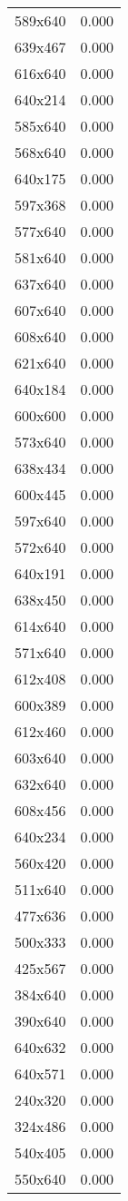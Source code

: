 \begin{table}
\begin{tabular}{lr}
589x640 & 0.000 \\
639x467 & 0.000 \\
616x640 & 0.000 \\
640x214 & 0.000 \\
585x640 & 0.000 \\
568x640 & 0.000 \\
640x175 & 0.000 \\
597x368 & 0.000 \\
577x640 & 0.000 \\
581x640 & 0.000 \\
637x640 & 0.000 \\
607x640 & 0.000 \\
608x640 & 0.000 \\
621x640 & 0.000 \\
640x184 & 0.000 \\
600x600 & 0.000 \\
573x640 & 0.000 \\
638x434 & 0.000 \\
600x445 & 0.000 \\
597x640 & 0.000 \\
572x640 & 0.000 \\
640x191 & 0.000 \\
638x450 & 0.000 \\
614x640 & 0.000 \\
571x640 & 0.000 \\
612x408 & 0.000 \\
600x389 & 0.000 \\
612x460 & 0.000 \\
603x640 & 0.000 \\
632x640 & 0.000 \\
608x456 & 0.000 \\
640x234 & 0.000 \\
560x420 & 0.000 \\
511x640 & 0.000 \\
477x636 & 0.000 \\
500x333 & 0.000 \\
425x567 & 0.000 \\
384x640 & 0.000 \\
390x640 & 0.000 \\
640x632 & 0.000 \\
640x571 & 0.000 \\
240x320 & 0.000 \\
324x486 & 0.000 \\
540x405 & 0.000 \\
550x640 & 0.000 \\

\end{tabular}
\end{table}
